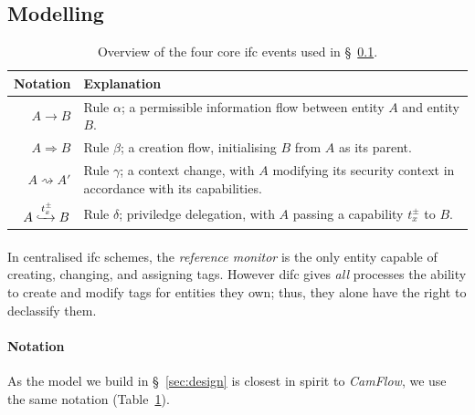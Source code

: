 \subsection{Modelling}
\label{sec:ifc-modelling}

\begin{table}
    \centering
    \newcommand\tableTop{\rule{0pt}{3ex}}
    \newcommand\tableMid{\rule{0pt}{3ex}}
    \newcommand\tableBottom{\rule[-2ex]{0pt}{0pt}}
    \begin{tabular}{r p{10cm}} 
        \hline
        Notation & Explanation \\ [0.1ex] 
        \hline
            \tableTop{$A \rightarrow B$} & \tableTop{Rule $\alpha$; a permissible information flow between entity $A$ and entity $B$.} \\
            
            $A \Rightarrow B$ & \tableMid{Rule $\beta$; a creation flow, initialising $B$ from $A$ as its parent.} \\

            $A \rightsquigarrow A'$ & \tableMid{Rule $\gamma$; a context change, with $A$ modifying its security context in accordance with its capabilities.} \\
            
            $A \xhookrightarrow[]{t^{\pm}_{x}} B$ & \tableMid{Rule $\delta$; priviledge delegation, with $A$ passing a capability $t_{x}^{\pm}$ to $B$.} \tableBottom \\
    \end{tabular}
    \caption[Overview of the four core IFC events]{Overview of the four core \acrshort{ifc} events used in §~\ref{sec:ifc-modelling}.}
    \label{table:ifc-notation}
\end{table}


\paragraph{} In centralised \acrshort{ifc} schemes, the \textit{reference monitor} is the only entity capable of creating, changing, and assigning tags. However \acrshort{difc} gives \textit{all} processes the ability to create and modify tags for entities they own; thus, they alone have the right to declassify them.

\paragraph{Notation} As the model we build in §~\ref{sec:design} is closest in spirit to \textit{CamFlow}, we use the same notation (Table~\ref{table:ifc-notation}).

